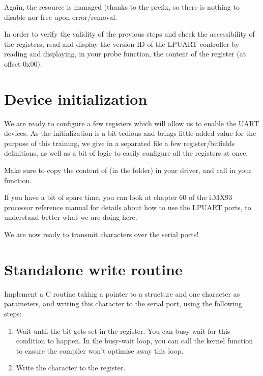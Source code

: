 Again, the resource is managed (thanks to the  prefix, so there is
nothing to disable nor free upon error/removal.

In order to verify the validity of the previous steps and check the
accessibility of the registers, read and display the version ID of the LPUART
controller by reading and displaying, in your probe function, the content of the
 register (at offset 0x00).

\section{Device initialization}

We are ready to configure a few registers which will allow us to enable the UART
devices. As the initialization is a bit tedious and brings little added value
for the purpose of this training, we give in a separated file a few
register/bitfields definitions, as well as a bit of logic to easily configure
all the registers at once.

Make sure to copy the content of  (in the 
folder) in your driver, and call  in
your  function.

If you have a bit of spare time, you can look at chapter 60 of the i.MX93
processor reference manual for details about how to use the LPUART ports, to
understand better what we are doing here.

We are now ready to transmit characters over the serial ports!

\section{Standalone write routine}

Implement a C routine taking a pointer to a 
structure and one character as parameters, and writing
this character to the serial port, using the following steps:

\begin{enumerate}
\item Wait until the  bit gets set in the
   register. You can busy-wait for this condition to happen.
  In the busy-wait loop, you can call the  kernel function
  to ensure the compiler won't optimise away this loop.
\item Write the character to the  register.
\end{enumerate}

